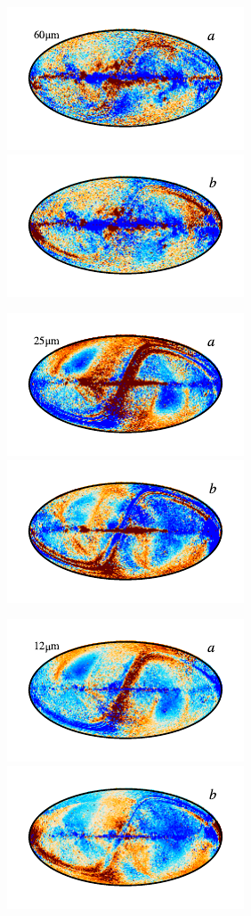 \documentclass{aa}
\begin{document}
\begin{figure}
	\includegraphics{figs/res_maps/res_07a_c0001_000019.pdf}\includegraphics{figs/res_maps/res_07b_c0001_000019.pdf}
  \vspace*{-0.85cm}

	\includegraphics{figs/res_maps/res_06a_c0001_000019.pdf}\includegraphics{figs/res_maps/res_06b_c0001_000019.pdf}
  \vspace*{-0.85cm}

	\includegraphics{figs/res_maps/res_05a_c0001_000019.pdf}\includegraphics{figs/res_maps/res_05b_c0001_000019.pdf}
  \vspace*{-0.85cm}
  

\end{figure}
\end{document}
